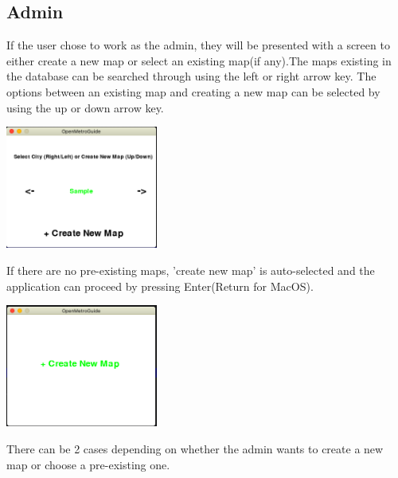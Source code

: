 \documentclass[fontsize=11pt]{article}
\begin{document}
    \subsection*{Admin}
    If the user chose to work as the admin, they will be presented with a screen to either create a new map or select an existing map(if any).The maps existing in the database can be searched through using the left or right arrow key. The options between an existing map and creating a new map can be selected by using the up or down arrow key.\\
    \begin{center}
        \includegraphics[width = 5cm]{Sample in database.png}\\
    \end{center}
    If there are no pre-existing maps, 'create new map' is auto-selected and the application can proceed by pressing Enter(Return for MacOS).\\
    \begin{center}
        \includegraphics[width = 5cm]{create new map.png}\\
    \end{center}
    There can be 2 cases depending on whether the admin wants to create a new map or choose a pre-existing one.
\end{document}
